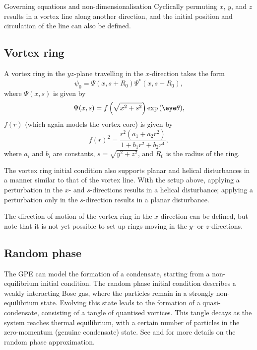 \begin{chapter}{\label{cha:equations}Governing equations and
  non-dimensionalisation}
  Cyclically permuting $x$, $y$, and $z$ results in a vortex line along another
  direction, and the initial position and circulation of the line can also be
  defined.

  \subsection{Vortex ring}
  A vortex ring in the $yz$-plane travelling in the $x$-direction takes the
  form \citep{Berloff04}
  \begin{equation*}
    \psi_{0} = \Psi(x, s+R_{0}) \Psi^{*}(x, s-R_{0}),
  \end{equation*}
  where $\Psi(x,s)$ is given by
  \begin{equation*}
    \Psi(x,s) = f\left( \sqrt{x^{2}+s^{2}} \right) \exp{(\eye \theta)},
  \end{equation*}
  $f(r)$ (which again models the vortex core) is given by
  \begin{equation*}
    f(r)^{2} = \frac{r^{2}\left( a_{1} + a_{2}r^{2} \right)}{1 + b_{1}r^{2} +
    b_{2}r^{4}},
  \end{equation*}
  where $a_{i}$ and $b_{i}$ are constants, $s = \sqrt{y^{2} + z^{2}}$, and
  $R_{0}$ is the radius of the ring.

  The vortex ring initial condition also supports planar and helical
  disturbances in a manner similar to that of the vortex line.  With the setup
  above, applying a perturbation in the $x$- and $s$-directions results in a
  helical disturbance; applying a perturbation only in the $s$-direction
  results in a planar disturbance.

  The direction of motion of the vortex ring in the $x$-direction can be
  defined, but note that it is not yet possible to set up rings moving in the
  $y$- or $z$-directions.

  \subsection{Random phase}
  The GPE can model the formation of a condensate, starting from a
  non-equilibrium initial condition.  The random phase initial condition
  describes a weakly interacting Bose gas, where the particles remain in a
  strongly non-equilibrium state.  Evolving this state leads to the formation
  of a quasi-condensate, consisting of a tangle of quantised vortices.  This
  tangle decays as the system reaches thermal equilibrium, with a certain
  number of particles in the zero-momentum (genuine condensate) state.  See
  \citet{BS02} and \citet{CJPPR05} for more details on the random phase
  approximation.


\end{chapter}
